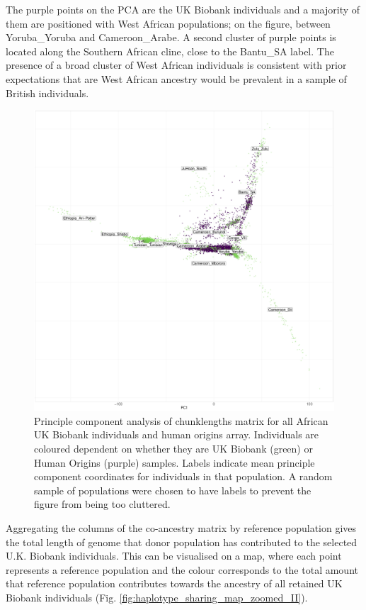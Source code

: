 The purple points on the PCA are the UK Biobank individuals and a majority of them are positioned with West African populations; on the figure, between Yoruba\_Yoruba and Cameroon\_Arabe. A second cluster of purple points is located along the Southern African cline, close to the Bantu\_SA label. The presence of a broad cluster of West African individuals is consistent with prior expectations that are West African ancestry would be prevalent in a sample of British individuals. 

\begin{figure}[htp]
    \centering
    \includegraphics[width=1.0\textwidth]{../images/chapter3/ChromoPainter_PCA_UKB_HO.pdf}
    \caption{Principle component analysis of chunklengths matrix for all African UK Biobank individuals and human origins array. Individuals are coloured dependent on whether they are UK Biobank (green) or Human Origins (purple) samples. Labels indicate mean principle component coordinates for individuals in that population. A random sample of populations were chosen to have labels to prevent the figure from being too cluttered.}
    \label{fig:PCA_chunklengths_HumanOrigins_UKBiobank}
\end{figure}

Aggregating the columns of the co-ancestry matrix by reference population gives the total length of genome that donor population has contributed to the selected U.K. Biobank individuals. This can be visualised on a map, where each point represents a reference population and the colour corresponds to the total amount that reference population contributes towards the ancestry of all retained UK Biobank individuals (Fig. \ref{fig:haplotype_sharing_map_zoomed_II}). 

